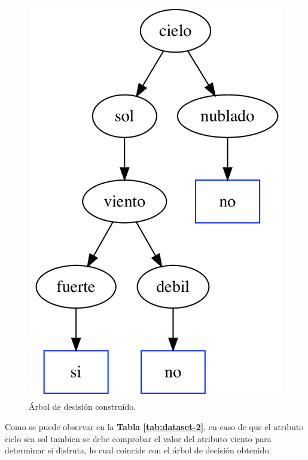 \documentclass[a4paper]{article}
\newcommand{\reftable}[1]{\textbf{Tabla \ref{#1}}}
\begin{document}
\begin{figure}[h]
  \centering
    \includegraphics[scale=0.4]{img/tree2.png}
  \caption{Árbol de decisión construído.}
  \label{ej1-tree2}
\end{figure}

Como se puede observar en la \reftable{tab:dataset-2}, en caso de que el atributo cielo sea sol tambien se debe comprobar el valor del atributo viento para determinar si disfruta, lo cual coincide con el árbol de decisión obtenido.
\end{document}
